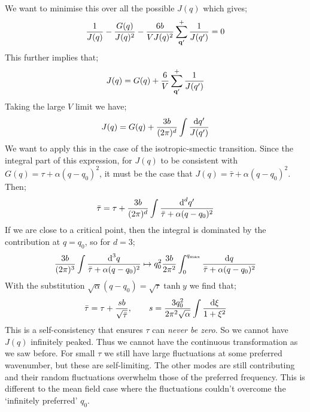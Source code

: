 We want to minimise this over all the possible $J(q)$ which gives;
\begin{equation*}
\frac{1}{J(q)} - \frac{G(q)}{J(q)^2} - \frac{6b}{V J(q)^2}\sum_{\mathbf{q}^{\prime}}^{+}{\frac{1}{J(q^{\prime})}} = 0
\end{equation*}
This further implies that;
\begin{equation*}
J(q) = G(q) + \frac{6}{V}\sum_{\mathbf{q}^{\prime}}^{+}{\frac{1}{J(q^{\prime})}}
\end{equation*}
Taking the large $V$ limit we have;\footnotemark
{}
\begin{equation}
J(q) = G(q) + \frac{3b}{(2\pi)^d}\int{\frac{\text{d}q^{\prime}}{J(q^{\prime})}}
\end{equation}
We want to apply this in the case of the isotropic-smectic transition. Since the integral part of this expression, for $J(q)$ to be consistent with $G(q) = \tau + \alpha(q - q_0)^2$, it must be the case that $J(q) = \bar{\tau} + \alpha(q - q_0)^2$. Then;
\begin{equation*}
\bar{\tau} = \tau + \frac{3b}{(2\pi)^d}\int{\frac{\text{d}^d q^{\prime}}{\bar{\tau} + \alpha(q-q_0)^2}}
\end{equation*}
If we are close to a critical point, then the integral is dominated by the contribution at $q = q_0$, so for $d = 3$;
\begin{equation*}
\frac{3b}{(2\pi)^3}\int{\frac{\text{d}^3 q}{\bar{\tau} + \alpha(q-q_0)^2}} \mapsto q_0^2 \frac{3b}{2\pi^2}\int_0^{q_{\text{max}}}{\frac{\text{d} q}{\bar{\tau} + \alpha(q - q_0)^2}}
\end{equation*}
With the substitution $\sqrt{\alpha}(q - q_0) = \sqrt{\tau}\tanh y$ we find that;
\begin{equation}
\bar{\tau} = \tau + \frac{sb}{\sqrt{\bar{\tau}}}, \qquad s = \frac{3q_0^2}{2\pi^2 \sqrt{\alpha}}\int{\frac{\text{d}\xi}{1 + \xi^2}}
\end{equation}
This is a self-consistency that ensures $\tau$ can \emph{never be zero}. So we cannot have $J(q)$ infinitely peaked. Thus we cannot have the continuous transformation as we saw before. For small $\tau$ we still have large fluctuations at some preferred wavenumber, but these are self-limiting. The other modes are still contributing and their random fluctuations overwhelm those of the preferred frequency. This is different to the mean field case where the fluctuations couldn't overcome the `infinitely preferred' $q_0$. 

